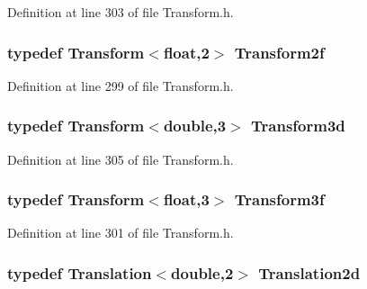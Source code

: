 Definition at line 303 of file Transform.\-h.

\hypertarget{group___geometry___module_ga286ec38c39d5e356dbfea7d695f09a41}{
\subsubsection[{Transform2f}]{\setlength{\rightskip}{0pt plus 5cm}typedef {\bf Transform}$<${\bf float},2$>$ {\bf Transform2f}}}\label{group___geometry___module_ga286ec38c39d5e356dbfea7d695f09a41}


Definition at line 299 of file Transform.\-h.

\hypertarget{group___geometry___module_ga93f2bb4699ee3ff37ff156a9c7a12d7c}{
\subsubsection[{Transform3d}]{\setlength{\rightskip}{0pt plus 5cm}typedef {\bf Transform}$<${\bf double},3$>$ {\bf Transform3d}}}\label{group___geometry___module_ga93f2bb4699ee3ff37ff156a9c7a12d7c}


Definition at line 305 of file Transform.\-h.

\hypertarget{group___geometry___module_gac2cfea9409b1ac589cc20f259b6189eb}{
\subsubsection[{Transform3f}]{\setlength{\rightskip}{0pt plus 5cm}typedef {\bf Transform}$<${\bf float},3$>$ {\bf Transform3f}}}\label{group___geometry___module_gac2cfea9409b1ac589cc20f259b6189eb}


Definition at line 301 of file Transform.\-h.

\hypertarget{group___geometry___module_gaa0b48ef208ba6abeb7f4786b552a3bc4}{
\subsubsection[{Translation2d}]{\setlength{\rightskip}{0pt plus 5cm}typedef {\bf Translation}$<${\bf double},2$>$ {\bf Translation2d}}}\label{group___geometry___module_gaa0b48ef208ba6abeb7f4786b552a3bc4}


